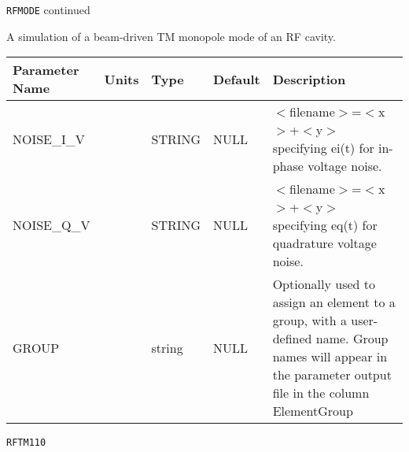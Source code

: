 \newpage
\begin{center}{\Large\verb|RFMODE| continued}\end{center}
A simulation of a beam-driven TM monopole mode of an RF cavity.
\\
\begin{tabular}{|l|l|l|l|p{\descwidth}|} \hline
Parameter Name & Units & Type & Default & Description \\ \hline 
NOISE\_I\_V &  & STRING &   NULL            & $<$filename$>$=$<$x$>$+$<$y$>$ specifying ei(t) for in-phase voltage noise.  \\ \hline 
NOISE\_Q\_V &  & STRING &   NULL            & $<$filename$>$=$<$x$>$+$<$y$>$ specifying eq(t) for quadrature voltage noise.  \\ \hline 
GROUP &  & string & NULL & Optionally used to assign an element to a group, with a user-defined name.  Group names will appear in the parameter output file in the column ElementGroup  \\ \hline 
\end{tabular}

\vspace*{0.5in}

\vspace*{0.5in}

\newpage
\begin{center}{\Large\verb|RFTM110|}\end{center}
